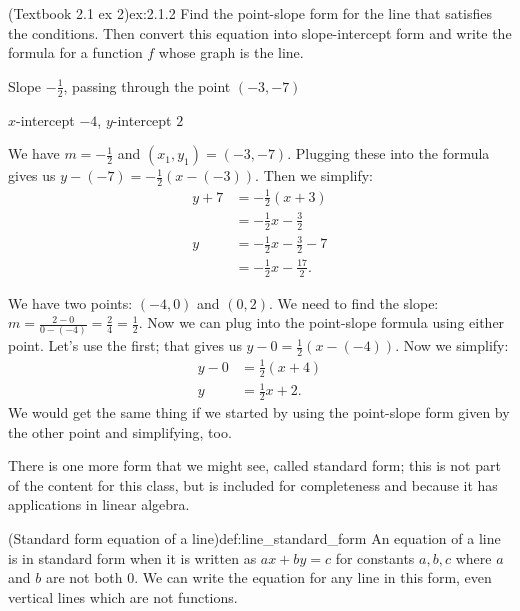 \documentclass{article}
\begin{document}
\begin{example}{(Textbook 2.1 ex 2)}{ex:2.1.2}
    Find the point-slope form for the line that satisfies the conditions. Then convert this equation into slope-intercept form and write the formula for a function $f$ whose graph is the line.
    \begin{problem}
        \item Slope $-\frac{1}{2}$, passing through the point $(-3,-7)$
        \item $x$-intercept $-4$, $y$-intercept $2$
    \end{problem}
\end{example}
\begin{solution}
    \begin{problem}
        \item We have $m=-\frac{1}{2}$ and $(x_1,y_1)=(-3,-7)$. Plugging these into the formula gives us $y-(-7)=-\frac{1}{2}(x-(-3))$. Then we simplify:
        \begin{align*}
            y+7&=-\frac{1}{2}(x+3)\\
            &=-\frac{1}{2}x-\frac{3}{2}\\
            y&=-\frac{1}{2}x-\frac{3}{2}-7\\
            &=-\frac{1}{2}x-\frac{17}{2}.
        \end{align*}
        \item We have two points: $(-4,0)$ and $(0,2)$. We need to find the slope: $m=\frac{2-0}{0-(-4)}=\frac{2}{4}=\frac{1}{2}$. Now we can plug into the point-slope formula using either point. Let's use the first; that gives us $y-0=\frac{1}{2}(x-(-4))$. Now we simplify:
        \begin{align*}
            y-0&=\frac{1}{2}(x+4)\\
            y&=\frac{1}{2}x+2.
        \end{align*}
        We would get the same thing if we started by using the point-slope form given by the other point and simplifying, too.
    \end{problem}
\end{solution}

There is one more form that we might see, called standard form; this is not part of the content for this class, but is included for completeness and because it has applications in linear algebra.
\begin{definition}{(Standard form equation of a line)}{def:line_standard_form}
    An equation of a line is in standard form when it is written as $ax+by=c$ for constants $a,b,c$ where $a$ and $b$ are not both 0. We can write the equation for any line in this form, even vertical lines which are not functions.
\end{definition}
\end{document}
